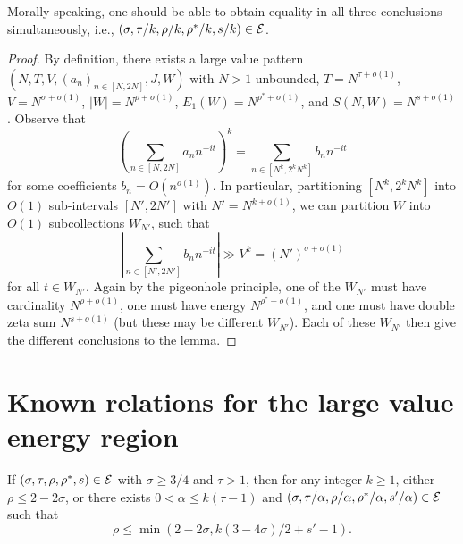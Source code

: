 Morally speaking, one should be able to obtain equality in all three conclusions simultaneously, i.e., $(\sigma,\tau/k,\rho/k,\rho^*/k,s/k) \in \mathcal{E}$.

\begin{proof} By definition, there exists a large value pattern $(N,T,V,(a_n)_{n \in [N,2N]},J,W)$ with $N > 1$ unbounded, $T = N^{\tau+o(1)}$, $V = N^{\sigma+o(1)}$, $|W| = N^{\rho+o(1)}$, $E_1(W) = N^{\rho^*+o(1)}$, and $S(N,W) = N^{s+o(1)}$.  Observe that
    $$ (\sum_{n \in [N,2N]} a_n n^{-it})^k = \sum_{n \in [N^k, 2^k N^k]} b_n n^{-it}$$
for some coefficients $b_n = O(n^{o(1)})$.  In particular, partitioning $[N^k, 2^k N^k]$ into $O(1)$ sub-intervals $[N',2N']$ with $N' = N^{k+o(1)}$, we can partition $W$ into $O(1)$ subcollections $W_{N'}$, such that
$$ |\sum_{n \in [N',2N']} b_n n^{-it}| \gg V^k = (N')^{\sigma+o(1)}$$
for all $t \in W_{N'}$.  Again by the pigeonhole principle, one of the $W_{N'}$ must have cardinality $N^{\rho+o(1)}$, one must have energy $N^{\rho^*+o(1)}$, and one must have double zeta sum $N^{s+o(1)}$ (but these may be different $W_{N'}$).  Each of these $W_{N'}$ then give the different conclusions to the lemma.
\end{proof}

\section{Known relations for the large value energy region}

\begin{theorem}\label{reflect}\cite[\S 11.5]{ivic} If $(\sigma,\tau,\rho,\rho^*,s) \in \mathcal{E}$ with $\sigma \geq 3/4$ and $\tau>1$, then for any integer $k \geq 1$, either $\rho \leq 2-2\sigma$, or there exists $0 < \alpha \leq k(\tau-1)$ and $(\sigma, \tau/\alpha, \rho/\alpha, \rho^*/\alpha, s'/\alpha) \in \mathcal{E}$ such that
$$ \rho \leq \min( 2-2\sigma, k(3-4\sigma)/2 + s' - 1).$$
\end{theorem}

